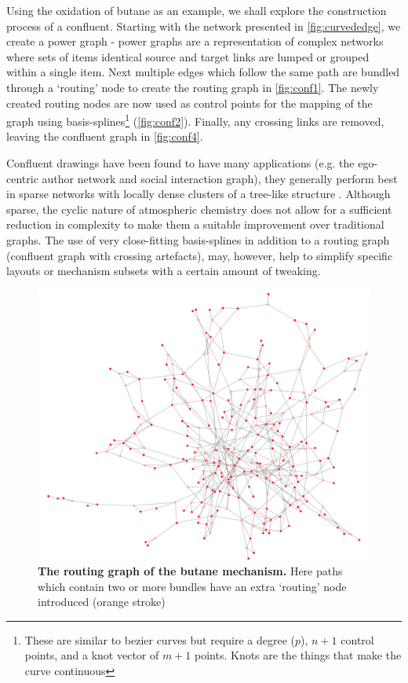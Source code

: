 Using the oxidation of butane as an example, we shall explore the construction process of a confluent. Starting with the network presented in \autoref{fig:curvededge}, we create a power graph -
power graphs are a representation of complex networks where sets of items identical source and target links are lumped or grouped within a single item. Next multiple edges which follow the same path are bundled through a `routing' node to create the routing graph in \autoref{fig:conf1}. The newly created routing nodes are now used as control points for the mapping of the graph using basis-splines\footnote{These are similar to bezier curves but require a degree ($p$), $n+1$ control points, and a knot vector of $m+1$ points. Knots are the things that make the curve continuous } (\autoref{fig:conf2}). Finally, any crossing links are removed, leaving the confluent graph in \autoref{fig:conf4}.

Confluent drawings have been found to have many applications (e.g. the ego-centric author network and social interaction graph), they generally perform best in sparse networks with locally dense clusters of a tree-like structure \citep{confluent17}. Although sparse, the cyclic nature of atmospheric chemistry does not allow for a sufficient reduction in complexity to make them a suitable improvement over traditional graphs. The use of very close-fitting basis-splines in addition to a routing graph (confluent graph with crossing artefacts), may, however, help to simplify specific layouts or mechanism subsets with a certain amount of tweaking.

\begin{figure}[H]
     \centering
     \includegraphics[width=.8\textwidth]{figures_c1/layout/confluent/1.png}
        \caption{\textbf{The routing graph of the butane mechanism.} Here paths which contain two or more bundles have an extra `routing' node introduced (orange stroke) }
      \label{fig:conf1}
\end{figure}

